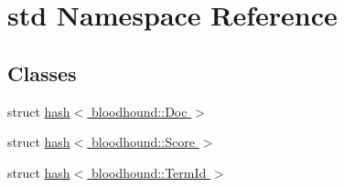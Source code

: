 \hypertarget{namespacestd}{}\section{std Namespace Reference}
\label{namespacestd}
\subsection*{Classes}
\begin{DoxyCompactItemize}
\item 
struct \hyperlink{structstd_1_1hash_3_01bloodhound_1_1Doc_01_4}{hash$<$ bloodhound\+::\+Doc $>$}
\item 
struct \hyperlink{structstd_1_1hash_3_01bloodhound_1_1Score_01_4}{hash$<$ bloodhound\+::\+Score $>$}
\item 
struct \hyperlink{structstd_1_1hash_3_01bloodhound_1_1TermId_01_4}{hash$<$ bloodhound\+::\+Term\+Id $>$}
\end{DoxyCompactItemize}
